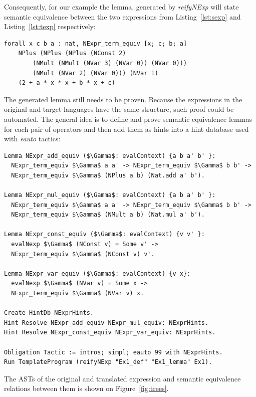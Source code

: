 \documentclass[sigplan]{acmart}\settopmatter{printfolios=true,printccs=false,printacmref=false}
\begin{document}
Consequently, for our example the lemma, generated by \emph{reifyNExp}
will state semantic equivalence between the two expressions from
Listing~\ref{lst:sexp} and Listing~\ref{lst:texp} respectively:

\begin{lstlisting}[language=Coq, mathescape=true,
  frame=single, basicstyle=\footnotesize]
forall x c b a : nat, NExpr_term_equiv [x; c; b; a]
    NPlus (NPlus (NPlus (NConst 2)
        (NMult (NMult (NVar 3) (NVar 0)) (NVar 0)))
        (NMult (NVar 2) (NVar 0))) (NVar 1)
    (2 + a * x * x + b * x + c)
\end{lstlisting}

The generated lemma still needs to be proven. Because the expressions
in the original and target languages have the same structure, such proof
could be automated. The general idea is to define and prove semantic
equivalence lemmas for each pair of operators and then add them as
hints into a hint database used with \emph{eauto} tactics:

\begin{lstlisting}[language=Coq, mathescape=true,
  frame=single, basicstyle=\footnotesize]
Lemma NExpr_add_equiv ($\Gamma$: evalContext) {a b a' b' }:
  NExpr_term_equiv $\Gamma$ a a' -> NExpr_term_equiv $\Gamma$ b b' ->
  NExpr_term_equiv $\Gamma$ (NPlus a b) (Nat.add a' b').

Lemma NExpr_mul_equiv ($\Gamma$: evalContext) {a b a' b' }:
  NExpr_term_equiv $\Gamma$ a a' -> NExpr_term_equiv $\Gamma$ b b' ->
  NExpr_term_equiv $\Gamma$ (NMult a b) (Nat.mul a' b').

Lemma NExpr_const_equiv ($\Gamma$: evalContext) {v v' }:
  evalNexp $\Gamma$ (NConst v) = Some v' ->
  NExpr_term_equiv $\Gamma$ (NConst v) v'.

Lemma NExpr_var_equiv ($\Gamma$: evalContext) {v x}:
  evalNexp $\Gamma$ (NVar v) = Some x ->
  NExpr_term_equiv $\Gamma$ (NVar v) x.

Create HintDb NExprHints.
Hint Resolve NExpr_add_equiv NExpr_mul_equiv: NExprHints.
Hint Resolve NExpr_const_equiv NExpr_var_equiv: NExprHints.

Obligation Tactic := intros; simpl; eauto 99 with NExprHints.
Run TemplateProgram (reifyNExp "Ex1_def" "Ex1_lemma" Ex1).
\end{lstlisting}

The ASTs of the original and translated expression and semantic
equivalence relations between them is shown on Figure~\ref{fig:trees}.
\end{document}
